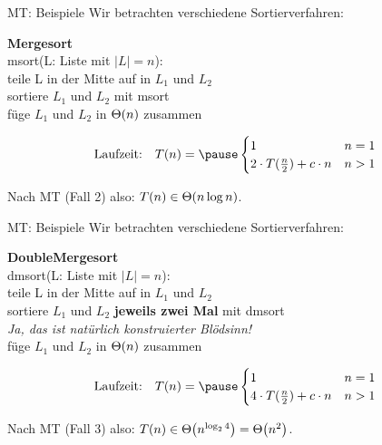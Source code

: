 \begin{frame}[t]{MT: Beispiele}
	Wir betrachten verschiedene Sortierverfahren:\\
	\bigskip
	
	\textbf{Mergesort}\\
	msort(L: Liste mit $|L| = n$):\\
	\quad	teile L in der Mitte auf in $L_1$ und $L_2$\\
	\quad	sortiere $L_1$ und $L_2$ mit msort \\
	\quad 	füge $L_1$ und $L_2$ in $\Theta\!\left(n\right)$ zusammen\\
	\medskip
	
	$$\text{Laufzeit:} \quad T(n) = \pause \begin{cases}
	1 & n = 1\\
	2 \cdot T(\fract n/2 ) + c \cdot n & n > 1
	\end{cases}$$
	
	\pause
	Nach MT (Fall 2) also: $T(n) \in \Theta\!\left(n \log n\right)$.
\end{frame}

\begin{frame}[t]{MT: Beispiele}
	Wir betrachten verschiedene Sortierverfahren:\\
	\bigskip
	
	\textbf{DoubleMergesort}\\
	dmsort(L: Liste mit $|L| = n$):\\
	\quad teile L in der Mitte auf in $L_1$ und $L_2$\\
	\quad sortiere $L_1$ und $L_2$ \textbf{jeweils zwei Mal} mit dmsort\\
	\qquad \textit{Ja, das ist natürlich konstruierter Blödsinn!}\\
	\quad füge $L_1$ und $L_2$ in $\Theta\!\left(n\right)$ zusammen\\
	\medskip
	
	$$\text{Laufzeit:} \quad T(n) = \pause \begin{cases}
	1 & n = 1\\
	4 \cdot T(\fract n/2 ) + c \cdot n  & n > 1
	\end{cases}$$
	
	\pause
	Nach MT (Fall 3) also: $T(n) \in \Theta\!\left(n^{\log_2 4}\right) = \Theta\!\left(n^2\right)$.
\end{frame}

